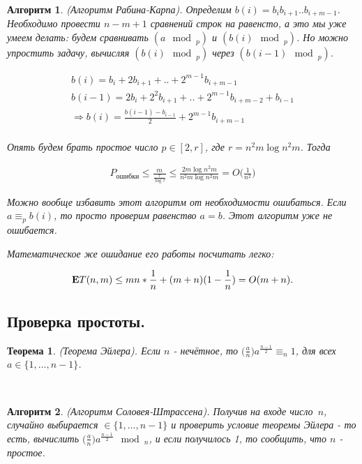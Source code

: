 \documentclass[a4paper]{article}
\theoremstyle{indented}
\newtheorem{theorem}{Теорема}
\newtheorem{alg}{Алгоритм}
\theoremstyle{definition}
\theoremstyle{remark}
\newcommand{\bea}{\begin{eqnarray*}}
\newcommand{\eea}{\end{eqnarray*}}
\newcommand{\be}{\begin{eqnarray}}
\newcommand{\ee}{\end{eqnarray}}
\begin{document}
\begin{alg}
    (Алгоритм Рабина-Карпа). Определим $b(i)=b_ib_{i+1} .. b_{i+m-1}$. Необходимо провести $n-m+1$ сравнений строк на равенсто, а это мы уже умеем делать: будем сравнивать $(a \mod_p)$ и $(b(i) \mod_p)$. Но можно упростить задачу, вычисляя $(b(i) \mod_p)$ через $(b(i-1) \mod_p)$. 

    \bea
        b(i)=b_i + 2b_{i+1} + .. + 2^{m-1}b_{i+m-1} \\
        b(i-1)=2b_i + 2^2b_{i+1}+ .. +2^{m-1}b_{i+m-2}+b_{i-1} \\
        \Rightarrow b(i)=\frac{b(i-1)-b_{i-1}}{2}+2^{m-1}b_{i+m-1} \\
    \eea
        
    Опять будем брать простое число $p \in [2, r]$, где $r = n^2m\log n^2 m$. Тогда
    
    \be
    P_{\text{ошибки}}\leq
            \frac{m}{\frac{\tau}{\log \tau}} \leq
            \frac{2m\log n^2m}{n^2m \log n^2m} =
                    O\biggl(\frac{1}{n^2}\biggr)
    \ee

    Можно вообще избавить этот алгоритм от необходимости ошибаться. Если $a\equiv_p b(i)$, то просто проверим равенство $a=b$. Этот алгоритм уже не ошибается. \ 

    Математическое же ошидание его работы посчитать легко:

    \be
                {\bf E}T(n,m) \leq mn*\frac{1}{n}+(m+n)(1-\frac{1}{n})=
                        O(m+n).
    \ee

\end{alg}

\subsection{Проверка простоты.} 

\begin{theorem}
    (Теорема Эйлера). Если $n$ - нечётное, то $\biggl( \frac{a}{n} \biggr) a^{\frac{n-1}{2}} \equiv_n 1$, для всех $a \in \{1, \ldots, n-1\}$. 
\end{theorem} \ 

\begin{alg}
    (Алгоритм Соловея-Штрассена). Получив на входе число $n$, случайно выбирается  $\in \{1, \ldots, n-1\}$ и проверить условие теоремы Эйлера - то есть, вычислить $\biggl( \frac{a}{n} \biggr) a^{\frac{n-1}{2}} \mod_n$, и если получилось 1, то сообщить, что $n$ - простое.
\end{alg}
\end{document}
